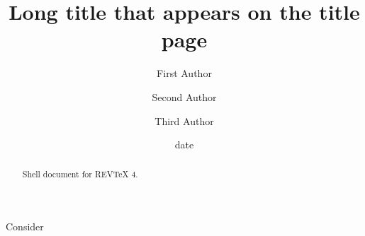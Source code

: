 \documentclass[aps,preprint]{revtex4}%
\begin{document}
\title[Short title for running header]{Long title that appears on the title page}
\author{First Author}
\author{Second Author}
\author{Third Author}

\begin{abstract}
Shell document for REV\TeX{} 4.

\end{abstract}
\date[Date text]{date}




\maketitle
\tableofcontents


Consider%
\end{document}
